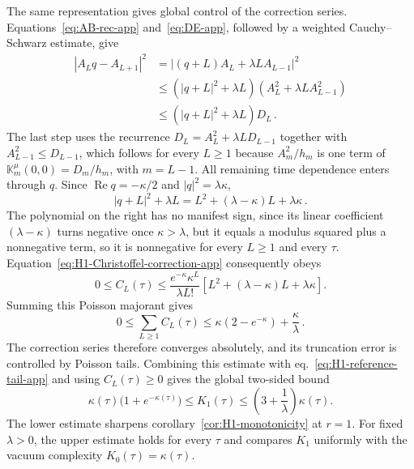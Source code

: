 \documentclass[a4paper,11pt]{article}
\def\ee{e}%
\theoremstyle{definition}
\theoremstyle{remark}
\newcommand{\ee}{\mathrm e}
\begin{document}
The same representation gives global control of the correction series. Equations~\eqref{eq:AB-rec-app} and~\eqref{eq:DE-app}, followed by a weighted Cauchy--Schwarz estimate, give
\begin{equation}
\begin{aligned}
   |A_Lq-A_{L+1}|^2
   &=
   \left|(q+L)A_L+\lambda L A_{L-1}\right|^2\\
   &\le
   \left(|q+L|^2+\lambda L\right)
   \left(A_L^2+\lambda L A_{L-1}^2\right)\\
   &\le
   \left(|q+L|^2+\lambda L\right)D_L\,.
\end{aligned}
   \label{eq:H1-correction-bound-app}
\end{equation}
The last step uses the recurrence $D_L=A_L^2+\lambda LD_{L-1}$ together with
$A_{L-1}^2\le D_{L-1}$, which follows for every $L\ge1$ because $A_m^2/h_m$ is one term of $\mathbb K_m^\mu(0,0)=D_m/h_m$, with $m=L-1$.
All remaining time dependence enters through $q$. Since \(\operatorname{Re}q=-\kappa/2\) and \(|q|^2=\lambda\kappa\),
\begin{equation}
   |q+L|^2+\lambda L
   =
   L^2+(\lambda-\kappa)L+\lambda\kappa\,.
\end{equation}
The polynomial on the right has no manifest sign, since its linear coefficient $(\lambda-\kappa)$ turns negative once $\kappa>\lambda$, but it equals a modulus squared plus a nonnegative term, so it is nonnegative for every $L\ge1$ and every $\tau$.  Equation~\eqref{eq:H1-Christoffel-correction-app} consequently obeys
\begin{equation}
   0\le C_L(\tau)\le
   \frac{\ee^{-\kappa}\kappa^L}{\lambda L!}
   \left[
      L^2+(\lambda-\kappa)L+\lambda\kappa
   \right].
   \label{eq:H1-correction-majorant-app}
\end{equation}
Summing this Poisson majorant gives
\begin{equation}
   0\le\sum_{L\ge1}C_L(\tau)
   \le
   \kappa(2-\ee^{-\kappa})+\frac{\kappa}{\lambda}\,.
   \label{eq:H1-correction-summed-bound-app}
\end{equation}
The correction series therefore converges absolutely, and its truncation error is controlled by Poisson tails. Combining this estimate with eq.~\eqref{eq:H1-reference-tail-app} and using $C_L(\tau)\ge0$ gives the global two-sided bound
\begin{equation}
   \kappa(\tau)\bigl(1+\ee^{-\kappa(\tau)}\bigr)
   \le K_1(\tau)
   \le
   \left(3+\frac{1}{\lambda}\right)\kappa(\tau).
   \label{eq:H1-complexity-global-bound-app}
\end{equation}
The lower estimate sharpens corollary~\ref{cor:H1-monotonicity} at $r=1$. For fixed $\lambda>0$, the upper estimate holds for every $\tau$ and compares $K_1$ uniformly with the vacuum complexity $K_0(\tau)=\kappa(\tau)$.
\end{document}
